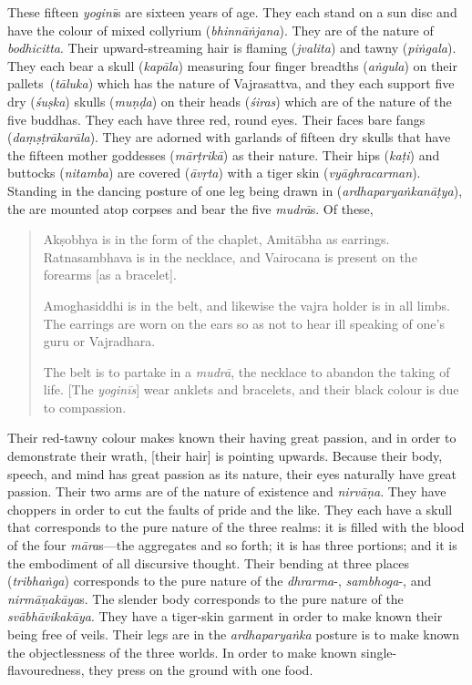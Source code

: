 \documentclass[naipra.tex]{subfiles}
\begin{document}
These fifteen \emph{yoginī}s are sixteen years of age.
They each stand on a sun disc and have the colour of mixed collyrium (\emph{bhinnāṅjana}).
They are of the nature of \emph{bodhicitta}.
Their upward-streaming hair is flaming (\emph{jvalita}) and tawny (\emph{piṅgala}).
They each bear a skull (\emph{kapāla}) measuring four finger breadths (\emph{aṅgula}) \crux on their pallets\crux\ (\emph{tāluka}) which has the nature of Vajrasattva, and they each support five dry (\emph{śuṣka}) skulls (\emph{muṇḍa}) on their heads (\emph{śiras}) which are of the nature of the five buddhas.
They each have three red, round eyes.
Their faces bare fangs (\emph{daṃṣṭrākarāla}).
They are adorned with garlands of fifteen dry skulls that have the fifteen mother goddesses (\emph{mārṭrikā}) as their nature.
Their hips (\emph{kaṭi}) and buttocks (\emph{nitamba}) are covered (\emph{āvṛta}) with a tiger skin (\emph{vyāghracarman}).
Standing in the dancing posture of one leg being drawn in (\emph{ardhaparyaṅkanāṭya}), the are mounted atop corpses and bear the five \emph{mudrā}s. 
Of these,

\begin{quote}
	Akṣobhya is in the form of the chaplet, Amitābha as earrings.
	Ratnasambhava is in the necklace, and Vairocana is present on the forearms [as a bracelet].
	
	Amoghasiddhi is in the belt, and likewise the vajra holder is in all limbs.
	The earrings are worn on the ears so as not to hear ill speaking of one's guru or Vajradhara.

	The belt is to partake in a \emph{mudrā}, the necklace to abandon the taking of life. 
	[The \emph{yoginīs}] wear anklets and bracelets, and their black colour is due to compassion.
\end{quote}

Their red-tawny colour makes known their having great passion, and in order to demonstrate their wrath, [their hair] is pointing upwards.
Because their body, speech, and mind has great passion as its nature, their eyes naturally have great passion.
Their two arms are of the nature of existence and \emph{nirvāṇa}.
They have choppers in order to cut the faults of pride and the like.
They each have a skull that corresponds to the pure nature of the three realms: it is filled with the blood of the four \emph{māra}s—the aggregates and so forth; it is has three portions; and it is the embodiment of all discursive thought.
Their bending at three places (\emph{tribhaṅga}) corresponds to the pure nature of the \emph{dhrarma}-, \emph{sambhoga}-, and \emph{nirmāṇakāya}s.
The slender body corresponds to the pure nature of the \emph{svābhāvikakāya}.
They have a tiger-skin garment in order to make known their being free of veils.
Their legs are \crux in the \emph{ardhaparyaṅka} posture \crux is to make known the objectlessness of the three worlds.
In order to make known single-flavouredness, they press on the ground with one food.
\end{document}
